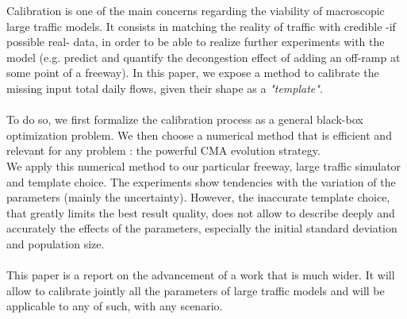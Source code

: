 Calibration is one of the main concerns regarding the viability of macroscopic large traffic models. It consists in matching the reality of traffic with credible -if possible real- data, in order to be able to realize further experiments with the model (e.g. predict and quantify the decongestion effect of adding an off-ramp at some point of a freeway). In this paper, we expose a method to calibrate the missing input total daily flows, given their shape as a \emph{"template"}.\\
\\
To do so, we first formalize the calibration process as a general black-box optimization problem. We then choose a numerical method that is efficient and relevant for any problem : the powerful CMA evolution strategy.\\
We apply this numerical method to our particular freeway, large traffic simulator and template choice. The experiments show tendencies with the variation of the parameters (mainly the uncertainty). However, the inaccurate template choice, that greatly limits the best result quality, does not allow to describe deeply and accurately the effects of the parameters, especially the initial standard deviation and population size. \\
\\
This paper is a report on the advancement of a work that is much wider. It will allow to calibrate jointly all the parameters of large traffic models and will be applicable to any of such, with any scenario.